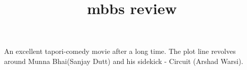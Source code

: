 \documentclass{article}
\title{mbbs review}
\begin{document}
\maketitle
An excellent tapori-comedy movie after a long time. The plot line revolves around Munna Bhai(Sanjay Dutt) and his sidekick - Circuit (Arshad Warsi).
\end{document}
